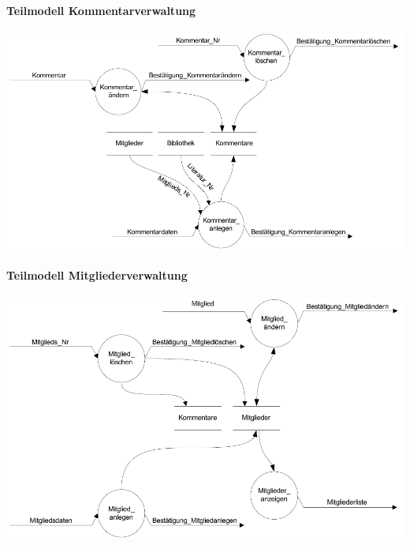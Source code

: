 \paragraph{Teilmodell Kommentarverwaltung}
\includegraphics[scale=0.93]{teilmodell_kommentarverwaltung}

\paragraph{Teilmodell Mitgliederverwaltung}
\includegraphics[scale=0.85]{teilmodell_mitgliederverwaltung}
\newpage

